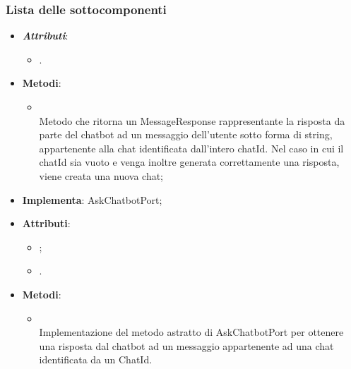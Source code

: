 \documentclass[10pt, a4paper]{article}
\begin{document}
\subsubsection{Lista delle sottocomponenti}

\label{AskChatbotControllerDettaglio}
\begin{itemize}
    \item \textbf{\textit{Attributi\pg}}:
    \begin{itemize}
        \item {}.
    \end{itemize}
    \item \textbf{Metodi}:
    \begin{itemize}
        \item {}\\
        Metodo che ritorna un MessageResponse rappresentante la risposta da parte del chatbot ad un messaggio dell'utente sotto forma di string, appartenente alla chat identificata dall'intero chatId. Nel caso in cui il chatId sia vuoto e venga inoltre generata correttamente una risposta, viene creata una nuova chat;
        
    \end{itemize}
\end{itemize}


\label{AskChatbotLangchainDettaglio}
\begin{itemize}
    \item \textbf{Implementa}: AskChatbotPort;
    \item \textbf{Attributi}:
    \begin{itemize}
        \item {};
        \item {}.
    \end{itemize}
    \item \textbf{Metodi}:
    \begin{itemize}
        \item {}\\
        Implementazione del metodo astratto di AskChatbotPort per ottenere una risposta dal chatbot ad un messaggio appartenente ad una chat identificata da un ChatId. 
    \end{itemize}
\end{itemize}
\end{document}
